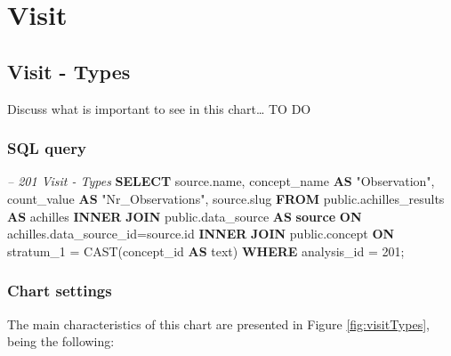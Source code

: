 \documentclass[]{book}
\newenvironment{Shaded}{\begin{snugshade}}{\end{snugshade}}
\newcommand{\KeywordTok}[1]{\textcolor[rgb]{0.13,0.29,0.53}{\textbf{#1}}}
\newcommand{\DecValTok}[1]{\textcolor[rgb]{0.00,0.00,0.81}{#1}}
\newcommand{\CommentTok}[1]{\textcolor[rgb]{0.56,0.35,0.01}{\textit{#1}}}
\newcommand{\OtherTok}[1]{\textcolor[rgb]{0.56,0.35,0.01}{#1}}
\newcommand{\FunctionTok}[1]{\textcolor[rgb]{0.00,0.00,0.00}{#1}}
\newcommand{\NormalTok}[1]{#1}
\begin{document}
\chapter{Visit}\label{visit}

\section{Visit - Types}\label{visit---types}

Discuss what is important to see in this chart\ldots{} TO DO

\subsection{SQL query}\label{sql-query-13}

\begin{Shaded}
\begin{Highlighting}[]
\CommentTok{-- 201  Visit - Types}
\KeywordTok{SELECT}\NormalTok{ source.name, }
\NormalTok{       concept_name }\KeywordTok{AS} \OtherTok{"Observation"}\NormalTok{, }
\NormalTok{       count_value }\KeywordTok{AS} \OtherTok{"Nr_Observations"}\NormalTok{,}
\NormalTok{       source.slug}
\KeywordTok{FROM}\NormalTok{ public.achilles_results }\KeywordTok{AS}\NormalTok{ achilles }
    \KeywordTok{INNER} \KeywordTok{JOIN}\NormalTok{ public.data_source }\KeywordTok{AS} \KeywordTok{source} \KeywordTok{ON} 
\NormalTok{      achilles.data_source_id=source.id}
    \KeywordTok{INNER} \KeywordTok{JOIN}\NormalTok{ public.concept }\KeywordTok{ON} 
\NormalTok{      stratum_1 = }\FunctionTok{CAST}\NormalTok{(concept_id }\KeywordTok{AS}\NormalTok{ text)}
\KeywordTok{WHERE}\NormalTok{ analysis_id = }\DecValTok{201}\NormalTok{;}
\end{Highlighting}
\end{Shaded}

\subsection{Chart settings}\label{chart-settings-13}

The main characteristics of this chart are presented in Figure
\ref{fig:visitTypes}, being the following:
\end{document}
